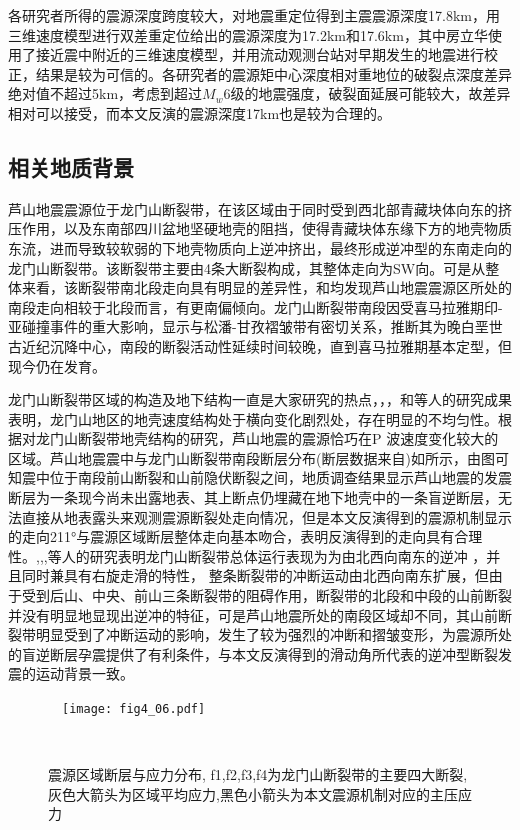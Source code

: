 各研究者所得的震源深度跨度较大，对地震重定位得到主震震源深度17.8km，用三维速度模型进行双差重定位给出的震源深度为17.2km和17.6km，其中房立华使用了接近震中附近的三维速度模型，并用流动观测台站对早期发生的地震进行校正，结果是较为可信的。各研究者的震源矩中心深度相对重地位的破裂点深度差异绝对值不超过5km，考虑到超过$M_w$6级的地震强度，破裂面延展可能较大，故差异相对可以接受，而本文反演的震源深度17km也是较为合理的。

\subsection{相关地质背景}
芦山地震震源位于龙门山断裂带，在该区域由于同时受到西北部青藏块体向东的挤压作用，以及东南部四川盆地坚硬地壳的阻挡，使得青藏块体东缘下方的地壳物质东流，进而导致较软弱的下地壳物质向上逆冲挤出，最终形成逆冲型的东南走向的龙门山断裂带\citep{Zhang2013}。该断裂带主要由4条大断裂构成，其整体走向为SW向。可是从整体来看，该断裂带南北段走向具有明显的差异性\citep{Jia2006,Arne1997}，和均发现芦山地震震源区所处的南段走向相较于北段而言，有更南偏倾向。龙门山断裂带南段因受喜马拉雅期印-亚碰撞事件的重大影响，显示与松潘-甘孜褶皱带有密切关系，推断其为晚白垩世古近纪沉降中心，南段的断裂活动性延续时间较晚，直到喜马拉雅期基本定型，但现今仍在发育。

龙门山断裂带区域的构造及地下结构一直是大家研究的热点\citep{Zhang2013,Wang2010,zhangzhongjie2009,Zhang2011}，\citet{Zhang2013}，\citet{Wang2010}，和\citet{Zhang2011}等人的研究成果表明，龙门山地区的地壳速度结构处于横向变化剧烈处，存在明显的不均匀性。根据对龙门山断裂带地壳结构的研究，芦山地震的震源恰巧在P 波速度变化较大的区域。芦山地震震中与龙门山断裂带南段断层分布(断层数据来自)如所示，由图可知震中位于南段前山断裂和山前隐伏断裂之间，地质调查结果显示芦山地震的发震断层为一条现今尚未出露地表、其上断点仍埋藏在地下地壳中的一条盲逆断层，无法直接从地表露头来观测震源断裂处走向情况，但是本文反演得到的震源机制显示的走向211°与震源区域断层整体走向基本吻合，表明反演得到的走向具有合理性。,,\citet{Densmore2007},等人的研究表明龙门山断裂带总体运行表现为为由北西向南东的逆冲 ，并且同时兼具有右旋走滑的特性， 整条断裂带的冲断运动由北西向南东扩展，但由于受到后山、中央、前山三条断裂带的阻碍作用，断裂带的北段和中段的山前断裂并没有明显地显现出逆冲的特征，可是芦山地震所处的南段区域却不同，其山前断裂带明显受到了冲断运动的影响，发生了较为强烈的冲断和摺皱变形，为震源所处的盲逆断层孕震提供了有利条件，与本文反演得到的滑动角所代表的逆冲型断裂发震的运动背景一致。
\begin{figure}
\centering
  \texttt{[image: fig4\_06.pdf]}
  \caption{ 震源区域断层与应力分布, f1,f2,f3,f4为龙门山断裂带的主要四大断裂,灰色大箭头为区域平均应力,黑色小箭头为本文震源机制对应的主压应力}
  \label{fig4_06}
\end{figure}

